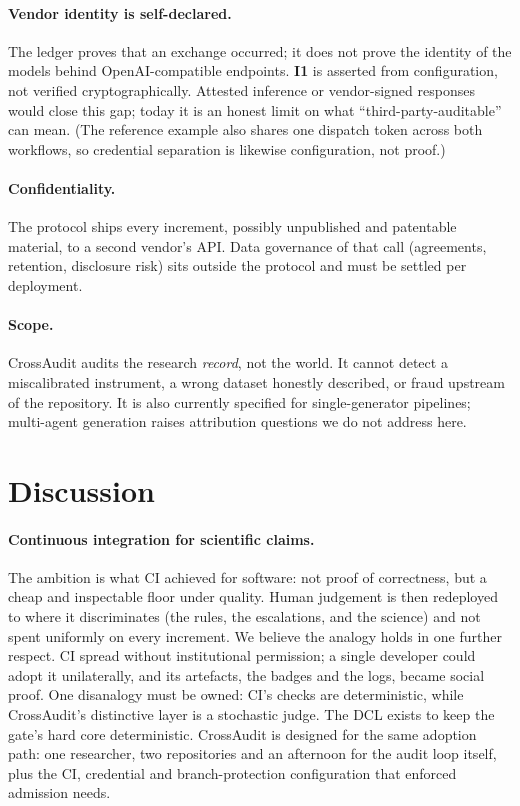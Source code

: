 \documentclass[11pt,letterpaper]{article}
\newcommand{\invariant}[1]{\textbf{I#1}}
\begin{document}
\paragraph{Vendor identity is self-declared.} The ledger proves that an exchange occurred; it does not prove the identity of the models behind OpenAI-compatible endpoints. \invariant{1} is asserted from configuration, not verified cryptographically. Attested inference or vendor-signed responses would close this gap; today it is an honest limit on what ``third-party-auditable'' can mean. (The reference example also shares one dispatch token across both workflows, so credential separation is likewise configuration, not proof.)

\paragraph{Confidentiality.} The protocol ships every increment, possibly unpublished and patentable material, to a second vendor's API. Data governance of that call (agreements, retention, disclosure risk) sits outside the protocol and must be settled per deployment.

\paragraph{Scope.} CrossAudit audits the research \emph{record}, not the world. It cannot detect a miscalibrated instrument, a wrong dataset honestly described, or fraud upstream of the repository. It is also currently specified for single-generator pipelines; multi-agent generation raises attribution questions we do not address here.

\section{Discussion}\label{sec:discussion}

\paragraph{Continuous integration for scientific claims.} The ambition is what CI achieved for software: not proof of correctness, but a cheap and inspectable floor under quality. Human judgement is then redeployed to where it discriminates (the rules, the escalations, and the science) and not spent uniformly on every increment. We believe the analogy holds in one further respect. CI spread without institutional permission; a single developer could adopt it unilaterally, and its artefacts, the badges and the logs, became social proof. One disanalogy must be owned: CI's checks are deterministic, while CrossAudit's distinctive layer is a stochastic judge. The DCL exists to keep the gate's hard core deterministic. CrossAudit is designed for the same adoption path: one researcher, two repositories and an afternoon for the audit loop itself, plus the CI, credential and branch-protection configuration that enforced admission needs.
\end{document}
